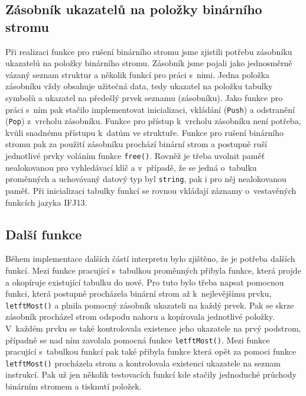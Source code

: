 \documentclass[12pt,a4paper,titlepage,final]{article}
\begin{document}
    \subsection{Zásobník ukazatelů na položky binárního stromu}

    Při realizaci funkce pro rušení binárního stromu jsme zjistili potřebu
    zásobníku ukazatelů na položky binárního stromu. Zásobník jsme pojali jako
    jednosměrně vázaný seznam struktur a několik funkcí pro práci s~nimi.
    Jedna položka zásobníku vždy obsahuje užitečná data, tedy ukazatel
    na položku tabulky symbolů a ukazatel na předešlý prvek seznamu
    (zásobníku). Jako funkce pro práci s~ním pak stačilo implementovat
    inicializaci, vkládání (\texttt{Push}) a odstranění (\texttt{Pop})
    z~vrcholu zásobníku. Funkce pro přístup k~vrcholu zásobníku není potřeba,
    kvůli snadnému přístupu k~datům ve struktuře. Funkce pro rušení binárního
    stromu pak za použití zásobníku prochází binární strom a postupně ruší
    jednotlivé prvky voláním funkce \texttt{free()}. Rovněž je třeba uvolnit
    paměť nealokovanou pro vyhledávací klíč a v~případě, že se jedná o~tabulku
    proměnných a uchovávaný datový typ byl \texttt{string}, pak i pro něj
    nealokovanou paměť. Při inicializaci tabulky funkcí se rovnou vkládají
    záznamy o~vestavěných funkcích jazyka IFJ13.

    \subsection{Další funkce}

    Během implementace dalších částí interpretu bylo zjištěno, že je potřeba
    dalších funkcí. Mezi funkce pracující s~tabulkou proměnných přibyla
    funkce, která projde a okopíruje existující tabulku do nové. Pro tuto bylo
    třeba napsat pomocnou funkci, která postupně procházela binární strom až
    k~nejlevějšímu prvku, \texttt{letftMost()} a plnila pomocný zásobník
    ukazateli na každý prvek. Pak se skrze zásobník procházel strom odspodu
    nahoru a kopírovala jednotlivé položky. V~každém prvku se také
    kontrolovala existence jeho ukazatele na prvý podstrom, případně se nad
    ním zavolala pomocná funkce \texttt{letftMost()}. Mezi funkce pracující
    s~tabulkou funkcí pak také přibyla funkce která opět za pomoci funkce
    \texttt{letftMost()} procházela strom a kontrolovala existenci ukazatele
    na seznam instrukcí. Pak už jen několik testovacích funkcí kde stačily
    jednoduché průchody binárním stromem a tisknutí položek.
\end{document}
